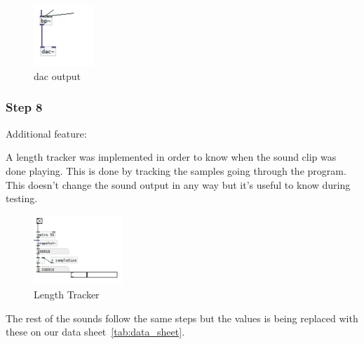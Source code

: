 \begin{figure}[!htbp]
    \centering
    \includegraphics[width=0.2\textwidth]{images/Implementation9.png}
    \caption{dac output}
    \label{fig:implementation9}
\end{figure}


\FloatBarrier
\subsubsection*{Step 8} %
\label{ssub:step_8}

Additional feature:

A length tracker was implemented in order to know when the sound clip was done playing. This is done by tracking the samples going through the program.
This doesn’t change the sound output in any way but it’s useful to know during testing.

\begin{figure}[!htbp]
    \centering
    \includegraphics[width=0.3\textwidth]{images/Implementation10.png}
    \caption{Length Tracker}
    \label{fig:implementation10}
\end{figure}

\FloatBarrier

The rest of the sounds follow the same steps but the values is being replaced with these on our data sheet~\ref{tab:data_sheet}.

